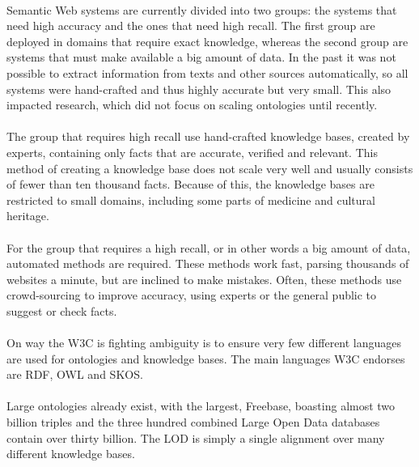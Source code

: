 \documentclass{article}
\begin{document}
 \paragraph{}
 Semantic Web systems are currently divided into two groups: the systems that need high accuracy and the ones that need high recall. The first group are deployed in domains that require exact knowledge, whereas the second group are systems that must make available a big amount of data. In the past it was not possible to extract information from texts and other sources automatically, so all systems were hand-crafted and thus highly accurate but very small. This also impacted research, which did not focus on scaling ontologies until recently.
 \paragraph{}
 The group that requires high recall use hand-crafted knowledge bases, created by experts, containing only facts that are accurate, verified and relevant. This method of creating a knowledge base does not scale very well and usually consists of fewer than ten thousand facts. Because of this, the knowledge bases are restricted to small domains, including some parts of medicine and cultural heritage\cite{byrne, le2002}.
 \paragraph{}
 For the group that requires a high recall, or in other words a big amount of data, automated methods are required. These methods work fast, parsing thousands of websites a minute, but are inclined to make mistakes. Often, these methods use crowd-sourcing to improve accuracy, using experts or the general public to suggest or check facts\cite{zhou2007}.
 \paragraph{}
 On way the W3C is fighting ambiguity is to ensure very few different languages are used for ontologies and knowledge bases. The main languages W3C endorses are RDF, OWL and SKOS\cite{rdf, owl, skos}. 
 \paragraph{}
 Large ontologies already exist, with the largest, Freebase, boasting almost two billion triples and the three hundred combined Large Open Data databases contain over thirty billion\cite{dbpedia, lod}. The LOD is simply a single alignment over many different knowledge bases.
\end{document}
